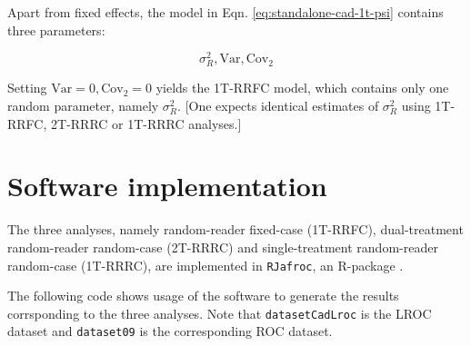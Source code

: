 \documentclass[
]{book}
\begin{document}
Apart from fixed effects, the model in Eqn. \eqref{eq:standalone-cad-1t-psi} contains three parameters:

\begin{equation}
\sigma_R^2, \text{Var}, \text{Cov}_2
\label{eq:standalone-cad-1t-parms}
\end{equation}

Setting \(\text{Var} = 0, \text{Cov}_2 = 0\) yields the 1T-RRFC model, which contains only one random parameter, namely \(\sigma_R^2\).
{[}One expects identical estimates of \(\sigma_R^2\) using 1T-RRFC, 2T-RRRC or 1T-RRRC analyses.{]}

\hypertarget{standalone-cad-radiologists-computational-details}{%
\section{Software implementation}\label{standalone-cad-radiologists-computational-details}}

The three analyses, namely random-reader fixed-case (1T-RRFC), dual-treatment random-reader random-case (2T-RRRC) and single-treatment random-reader random-case (1T-RRRC), are implemented in \texttt{RJafroc}, an R-package \citep{packageRJafroc}.

The following code shows usage of the software to generate the results corrsponding to the three analyses. Note that \texttt{datasetCadLroc} is the LROC dataset and \texttt{dataset09} is the corresponding ROC dataset.
\end{document}
